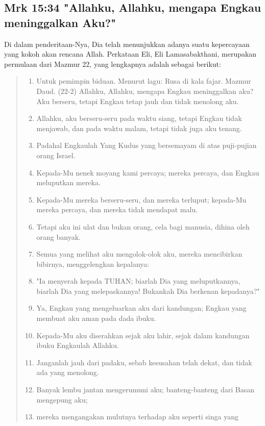 \subsection{Mrk 15:34 "Allahku, Allahku, mengapa Engkau meninggalkan Aku?"}
Di dalam penderitaan-Nya, Dia telah menunjukkan adanya suatu kepercayaan yang
kokoh akan rencana Allah. Perkataan Eli, Eli Lamasabakthani, merupakan
permulaan dari Mazmur 22, yang lengkapnya adalah sebagai berikut:
\begin{quote}
\scriptsize
\begin{enumerate}
     \item  Untuk pemimpin biduan. Menurut lagu: Rusa di kala fajar. Mazmur
     Daud. (22-2) Allahku, Allahku, mengapa Engkau meninggalkan aku? Aku
     berseru, tetapi Engkau tetap jauh dan tidak menolong aku.
     \item Allahku, aku berseru-seru pada waktu siang, tetapi Engkau tidak
     menjawab, dan pada waktu malam, tetapi tidak juga aku tenang.
     \item Padahal Engkaulah Yang Kudus yang bersemayam di atas puji-pujian
     orang Israel.
     \item Kepada-Mu nenek moyang kami percaya; mereka percaya, dan Engkau
     meluputkan mereka.
     \item Kepada-Mu mereka berseru-seru, dan mereka terluput; kepada-Mu
     mereka percaya, dan mereka tidak mendapat malu.
     \item Tetapi aku ini ulat dan bukan orang, cela bagi manusia, dihina oleh
     orang banyak.
     \item Semua yang melihat aku mengolok-olok aku, mereka mencibirkan
     bibirnya, menggelengkan kepalanya:
     \item "Ia menyerah kepada TUHAN; biarlah Dia yang meluputkannya, biarlah
     Dia yang melepaskannya! Bukankah Dia berkenan kepadanya?"
     \item Ya, Engkau yang mengeluarkan aku dari kandungan; Engkau yang
     membuat aku aman pada dada ibuku.
     \item Kepada-Mu aku diserahkan sejak aku lahir, sejak dalam kandungan
     ibuku Engkaulah Allahku.
     \item Janganlah jauh dari padaku, sebab kesusahan telah dekat, dan tidak
     ada yang menolong.
     \item Banyak lembu jantan mengerumuni aku; banteng-banteng dari Basan
     mengepung aku;
     \item mereka mengangakan mulutnya terhadap aku seperti singa yang

\end{enumerate}
\end{quote}
